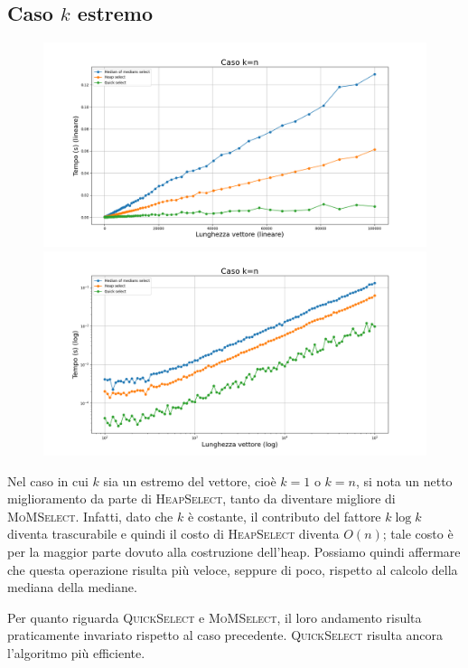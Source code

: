 \documentclass[a4paper,12pt]{article}
\newcommand{\QuickSelect}{\textsc{QuickSelect}}
\newcommand{\HeapSelect}{\textsc{HeapSelect}}
\newcommand{\MoMSelect}{\textsc{MoMSelect}}
\begin{document}
\subsection{Caso $k$ estremo}
\begin{figure}[h]
            \centering
            \includegraphics[width=.83\textwidth]{graphs/k_last_n.png}
            \includegraphics[width=.83\textwidth]{graphs/k_last_2xlog.png}
\end{figure}
Nel caso in cui $k$ sia un estremo del vettore, cioè $k=1$ o $k=n$, si nota un netto miglioramento da parte di \HeapSelect{}, tanto da diventare migliore di \MoMSelect{}.
Infatti, dato che $k$ è costante, il contributo del fattore $k\log k$ diventa trascurabile e quindi il costo di \HeapSelect{} diventa $O(n)$; tale costo è per la maggior parte dovuto alla costruzione dell'heap.
Possiamo quindi affermare che questa operazione risulta più veloce, seppure di poco, rispetto al calcolo della mediana della mediane.

Per quanto riguarda \QuickSelect{} e \MoMSelect{}, il loro andamento risulta praticamente invariato rispetto al caso precedente.
\QuickSelect{} risulta ancora l'algoritmo più efficiente.


\newpage
\end{document}
